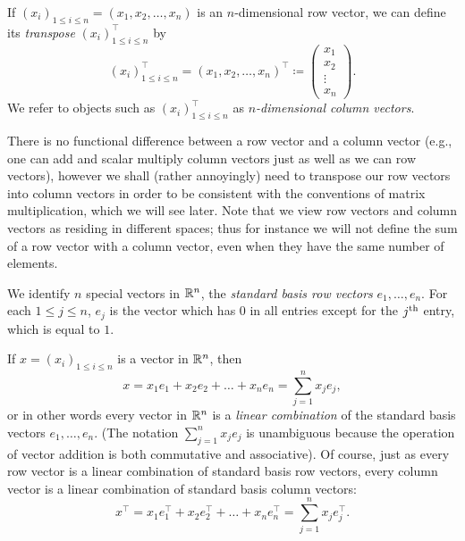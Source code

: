 \begin{defn}[Transpose]\label{ii:6.1.3}
  If \((x_i)_{1 \leq i \leq n} = (x_1, x_2, \dots, x_n)\) is an \(n\)-dimensional row vector, we can define its \emph{transpose} \((x_i)_{1 \leq i \leq n}^\top\) by
  \[
    (x_i)_{1 \leq i \leq n}^\top = (x_1, x_2, \dots, x_n)^\top \coloneqq \begin{pmatrix}
      x_1    \\
      x_2    \\
      \vdots \\
      x_n
    \end{pmatrix}.
  \]
  We refer to objects such as \((x_i)_{1 \leq i \leq n}^\top\) as \emph{\(n\)-dimensional column vectors}.
\end{defn}

\begin{rmk}\label{ii:6.1.4}
  There is no functional difference between a row vector and a column vector (e.g., one can add and scalar multiply column vectors just as well as we can row vectors), however we shall (rather annoyingly) need to transpose our row vectors into column vectors in order to be consistent with the conventions of matrix multiplication, which we will see later.
  Note that we view row vectors and column vectors as residing in different spaces;
  thus for instance we will not define the sum of a row vector with a column vector, even when they have the same number of elements.
\end{rmk}

\begin{defn}\label{ii:6.1.5}
  We identify \(n\) special vectors in \(\mathbb{R}^n\), the \emph{standard basis row vectors} \(e_1, \dots, e_n\).
  For each \(1 \leq j \leq n\), \(e_j\) is the vector which has \(0\) in all entries except for the \(j^{\operatorname{th}}\) entry, which is equal to \(1\).
\end{defn}

\begin{note}
  If \(x = (x_i)_{1 \leq i \leq n}\) is a vector in \(\mathbb{R}^n\), then
  \[
    x = x_1 e_1 + x_2 e_2 + \dots + x_n e_n = \sum_{j = 1}^n x_j e_j,
  \]
  or in other words every vector in \(\mathbb{R}^n\) is a \emph{linear combination} of the standard basis vectors \(e_1, \dots, e_n\).
  (The notation \(\sum_{j = 1}^n x_j e_j\) is unambiguous because the operation of vector addition is both commutative and associative).
  Of course, just as every row vector is a linear combination of standard basis row vectors, every column vector is a linear combination of standard basis column vectors:
  \[
    x^\top = x_1 e_1^\top + x_2 e_2^\top + \dots + x_n e_n^\top = \sum_{j = 1}^n x_j e_j^\top.
  \]
\end{note}

